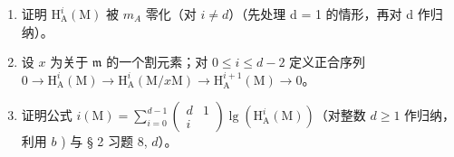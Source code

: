 \begin{enumerate}
\def\labelenumi{\alph{enumi})}
\item
  证明 \(\mathrm{H}_{\mathrm{A}}^{i}(\mathrm{M})\) 被 \(m_{A}\) 零化（对 \(i \neq d\)）（先处理 d = 1 的情形，再对 d 作归纳）。
\item
  设 \(x\) 为关于 \(\mathfrak{m}\) 的一个割元素；对 \(0 \leqslant i \leqslant d - 2\) 定义正合序列 \(0 \to \mathrm{H}_{\mathrm{A}}^{i}(\mathrm{M}) \to \mathrm{H}_{\mathrm{A}}^{i}(\mathrm{M}/x\mathrm{M}) \to \mathrm{H}_{\mathrm{A}}^{i+1}(\mathrm{M}) \to 0\)。
\item
  证明公式 \(i(\mathrm{M}) = \sum_{i=0}^{d-1} \left( \begin{array}{cc} d & 1 \\ i & \end{array} \right) \lg(\mathrm{H}_{\mathrm{A}}^i(\mathrm{M}))\)（对整数 \(d \geqslant 1\) 作归纳，利用 \(b\) ) 与 § 2 习题 8, \(d\)）。
\end{enumerate}

